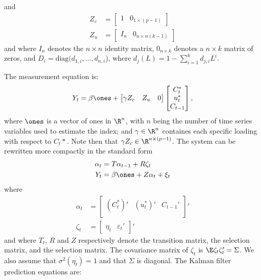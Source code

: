 and
\begin{equation}
	\begin{aligned}
		Z_c & = \begin{bmatrix}
			1 & 0_{1\times(p-1)}
		\end{bmatrix}\\
		Z_u & = \begin{bmatrix}
			I_n & 0_{n\times n (k-1)}
		\end{bmatrix}
	\end{aligned}
\end{equation}
and where $I_n$ denotes the $n\times n$ identity matrix, $0_{n\times k}$ denotes a $n\times k$ matrix of zeros, and $D_i = \text{diag}(d_{1,i}, \ldots, d_{n,i}$), where $d_j(L) = 1- \sum_{i=1}^k d_{j,i} L^i$.

The measurement equation is:
\begin{equation}
	Y_t = \beta \ones + \begin{bmatrix}
		\gamma Z_c & Z_u & 0 
	\end{bmatrix}
	\begin{bmatrix}
		C_t^\ast\\u_t^\ast \\ C_{t-1}
	\end{bmatrix},
\end{equation}
where $\ones$ is a vector of ones in $\R^n$, with $n$ being the number of time series variables used to estimate the index; and $\gamma\in \R^n$ containes each specific loading with respect to $C_t\ast$. Note then that $\gamma Z_c\in \R^{n\times (p-1)}$. The system can be rewritten more compactly in the standard form
\begin{align}
	\alpha_t & = T \alpha_{t-1} + R\zeta_t \label{eq:alpha}\\
	Y_t & = \beta \ones + Z\alpha_t + \xi_t\label{eq:Y}
\end{align}
where
\begin{equation}
	\begin{aligned}
		\alpha_t &= \begin{bmatrix}
			(C_t^\ast)' & (u_t^\ast)' & C_{t-1}'\\
		\end{bmatrix}'\\
		\zeta_t & = \begin{bmatrix}
			\eta_t & \varepsilon_t'
		\end{bmatrix}'
	\end{aligned}
\end{equation}
and where $T_t$, $R$ and $Z$ respectively denote the transition matrix, the selection matrix, and the selection matrix. The covariance matrix of $\zeta_t$ is $\E\zeta_t\zeta_t'=\Sigma$. We also assume that $\sigma^2(\eta_t) = 1$ and that $\Sigma$ is diagonal. The Kalman filter prediction equations are: 
